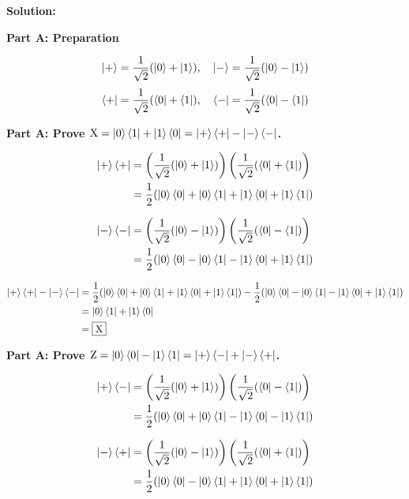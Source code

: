 \documentclass[11pt]{article}
\newenvironment{solution}
{\par\noindent\textbf{Solution:}\par}
{\vspace{1em}}
\begin{document}
\begin{solution}

\textbf{Part A: Preparation}

\[\ket{+} = \frac{1}{\sqrt{2}}(\ket{0} + \ket{1}), \quad \ket{-} = \frac{1}{\sqrt{2}}(\ket{0} - \ket{1})\]
\[\bra{+} = \frac{1}{\sqrt{2}}(\bra{0} + \bra{1}), \quad \bra{-} = \frac{1}{\sqrt{2}}(\bra{0} - \bra{1})\]

\textbf{Part A: Prove $\operatorname{X} = \ket{0}\bra{1} + \ket{1}\bra{0} = \ket{+}\bra{+} - \ket{-}\bra{-}$.}

\[\begin{aligned}
\ket{+}\bra{+} &= \left(\frac{1}{\sqrt{2}}(\ket{0} + \ket{1})\right)\left(\frac{1}{\sqrt{2}}(\bra{0} + \bra{1})\right) \\ 
&= \frac{1}{2}(\ket{0}\bra{0} + \ket{0}\bra{1} + \ket{1}\bra{0} + \ket{1}\bra{1})
\end{aligned}\]

\[\begin{aligned}
\ket{-}\bra{-} &= \left(\frac{1}{\sqrt{2}}(\ket{0} - \ket{1})\right)\left(\frac{1}{\sqrt{2}}(\bra{0} - \bra{1})\right) \\ 
&= \frac{1}{2}(\ket{0}\bra{0} - \ket{0}\bra{1} - \ket{1}\bra{0} + \ket{1}\bra{1})
\end{aligned}\]

\[\begin{aligned}
\ket{+}\bra{+} - \ket{-}\bra{-} &= \frac{1}{2}(\ket{0}\bra{0} + \ket{0}\bra{1} + \ket{1}\bra{0} + \ket{1}\bra{1}) - \frac{1}{2}(\ket{0}\bra{0} - \ket{0}\bra{1} - \ket{1}\bra{0} + \ket{1}\bra{1}) \\
&= \ket{0}\bra{1} + \ket{1}\bra{0} \\
&= \boxed{\operatorname{X}}
\end{aligned}\]

\textbf{Part A: Prove $\operatorname{Z} = \ket{0}\bra{0} - \ket{1}\bra{1} = \ket{+}\bra{-} + \ket{-}\bra{+}$.}

\[\begin{aligned}
\ket{+}\bra{-} &= \left(\frac{1}{\sqrt{2}}(\ket{0} + \ket{1})\right)\left(\frac{1}{\sqrt{2}}(\bra{0} - \bra{1})\right) \\ 
&= \frac{1}{2}(\ket{0}\bra{0} + \ket{0}\bra{1} - \ket{1}\bra{0} - \ket{1}\bra{1})
\end{aligned}\]

\[\begin{aligned}
\ket{-}\bra{+} &= \left(\frac{1}{\sqrt{2}}(\ket{0} - \ket{1})\right)\left(\frac{1}{\sqrt{2}}(\bra{0} + \bra{1})\right) \\ 
&= \frac{1}{2}(\ket{0}\bra{0} - \ket{0}\bra{1} + \ket{1}\bra{0} + \ket{1}\bra{1})
\end{aligned}\]


\end{solution}
\end{document}
